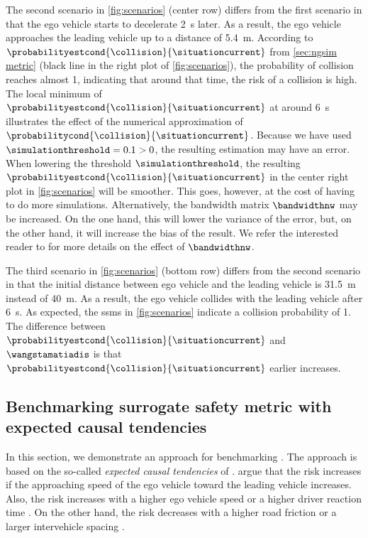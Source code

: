 The second scenario in \cref{fig:scenarios} (center row) differs from the first scenario in that the ego vehicle starts to decelerate \SI{2}{\second} later.
As a result, the ego vehicle approaches the leading vehicle up to a distance of \SI{5.4}{\meter}.
According to $\probabilityestcond{\collision}{\situationcurrent}$ from \cref{sec:ngsim metric} (black line in the right plot of \cref{fig:scenarios}), the probability of collision reaches almost 1, indicating that around that time, the risk of a collision is high.
The local minimum of $\probabilityestcond{\collision}{\situationcurrent}$ at around \SI{6}{\second} illustrates the effect of the numerical approximation of $\probabilitycond{\collision}{\situationcurrent}$.
Because we have used $\simulationthreshold=0.1>0$, the resulting estimation may have an error. 
When lowering the threshold $\simulationthreshold$, the resulting $\probabilityestcond{\collision}{\situationcurrent}$ in the center right plot in \cref{fig:scenarios} will be smoother. 
This goes, however, at the cost of having to do more simulations.
Alternatively, the bandwidth matrix $\bandwidthnw$ may be increased. 
On the one hand, this will lower the variance of the error, but, on the other hand, it will increase the bias of the result.
We refer the interested reader to \autocite{chen2017tutorial} for more details on the effect of $\bandwidthnw$.

The third scenario in \cref{fig:scenarios} (bottom row) differs from the second scenario in that the initial distance between ego vehicle and the leading vehicle is \SI{31.5}{\meter} instead of \SI{40}{\meter}. 
As a result, the ego vehicle collides with the leading vehicle after \SI{6}{\second}.
As expected, the \acp{ssm} in \cref{fig:scenarios} indicate a collision probability of 1.
The difference between $\probabilityestcond{\collision}{\situationcurrent}$ and $\wangstamatiadis$ is that $\probabilityestcond{\collision}{\situationcurrent}$ earlier increases. 



\subsection{Benchmarking surrogate safety metric with expected causal tendencies}
\label{sec:tendencies}

In this section, we demonstrate an approach for benchmarking .
The approach is based on the so-called \emph{expected causal tendencies} of \textcite{mullakkal2017comparative}.
\textcite{mullakkal2017comparative} argue that the risk increases if the approaching speed of the ego vehicle toward the leading vehicle increases.
Also, the risk increases with a higher ego vehicle speed \autocite{aarts2006driving} or a higher driver reaction time \autocite{klauer2006impact}.
On the other hand, the risk decreases with a higher road friction \autocite{wallman2001friction} or a larger intervehicle spacing \autocite{mullakkal2017comparative}.


